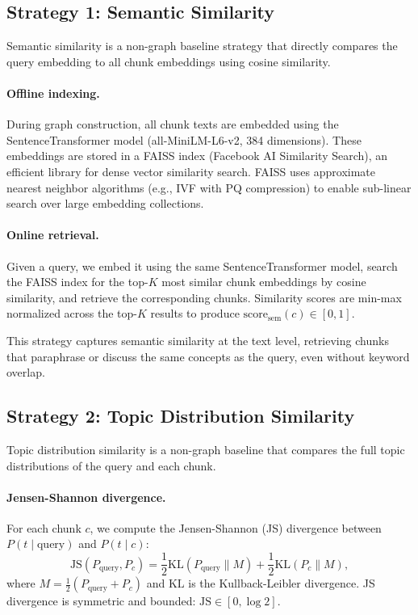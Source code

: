 \documentclass[10pt]{article}
\begin{document}
\subsection{Strategy 1: Semantic Similarity}

Semantic similarity is a non-graph baseline strategy that directly compares the query embedding to all chunk embeddings using cosine similarity.

\paragraph{Offline indexing.} During graph construction, all chunk texts are embedded using the SentenceTransformer model (all-MiniLM-L6-v2, 384 dimensions). These embeddings are stored in a FAISS index (Facebook AI Similarity Search), an efficient library for dense vector similarity search. FAISS uses approximate nearest neighbor algorithms (e.g., IVF with PQ compression) to enable sub-linear search over large embedding collections.

\paragraph{Online retrieval.} Given a query, we embed it using the same SentenceTransformer model, search the FAISS index for the top-$K$ most similar chunk embeddings by cosine similarity, and retrieve the corresponding chunks. Similarity scores are min-max normalized across the top-$K$ results to produce $\text{score}_{\text{sem}}(c) \in [0,1]$.

This strategy captures semantic similarity at the text level, retrieving chunks that paraphrase or discuss the same concepts as the query, even without keyword overlap.

\subsection{Strategy 2: Topic Distribution Similarity}

Topic distribution similarity is a non-graph baseline that compares the full topic distributions of the query and each chunk.

\paragraph{Jensen-Shannon divergence.} For each chunk $c$, we compute the Jensen-Shannon (JS) divergence between $P(t \mid \text{query})$ and $P(t \mid c)$:
\[
\text{JS}(P_{\text{query}}, P_c) = \frac{1}{2} \text{KL}(P_{\text{query}} \| M) + \frac{1}{2} \text{KL}(P_c \| M),
\]
where $M = \frac{1}{2}(P_{\text{query}} + P_c)$ and $\text{KL}$ is the Kullback-Leibler divergence. JS divergence is symmetric and bounded: $\text{JS} \in [0, \log 2]$.
\end{document}
